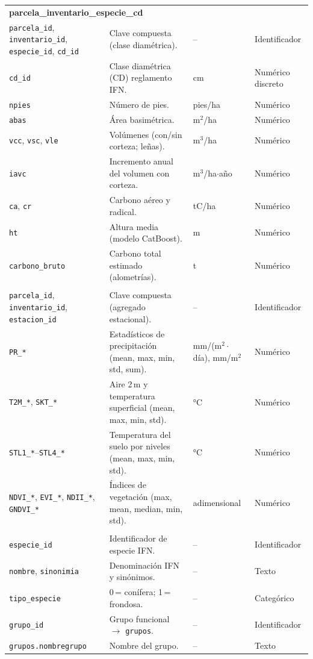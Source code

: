 \begin{longtable}{p{3.2cm} p{7.6cm} p{2.4cm} p{2.4cm}}
\multicolumn{4}{l}{\textbf{parcela\_inventario\_especie\_cd}} \\
\texttt{parcela\_id}, \texttt{inventario\_id}, \texttt{especie\_id}, \texttt{cd\_id} & Clave compuesta (clase diamétrica). & -- & Identificador \\
\texttt{cd\_id} & Clase diamétrica (CD) reglamento IFN. & cm & Numérico discreto \\
\texttt{npies} & Número de pies. & pies/ha & Numérico \\
\texttt{abas} & Área basimétrica. & m$^{2}$/ha & Numérico \\
\texttt{vcc}, \texttt{vsc}, \texttt{vle} & Volúmenes (con/sin corteza; leñas). & m$^{3}$/ha & Numérico \\
\texttt{iavc} & Incremento anual del volumen con corteza. & m$^{3}$/ha$\cdot$año & Numérico \\
\texttt{ca}, \texttt{cr} & Carbono aéreo y radical. & tC/ha & Numérico \\
\texttt{ht} & Altura media (modelo CatBoost). & m & Numérico \\
\texttt{carbono\_bruto} & Carbono total estimado (alometrías). & t & Numérico \\
\addlinespace

\multicolumn{4}{l}{\textbf{parcela\_inventario\_estacion}} \\
\texttt{parcela\_id}, \texttt{inventario\_id}, \texttt{estacion\_id} & Clave compuesta (agregado estacional). & -- & Identificador \\
\texttt{PR\_*} & Estadísticos de precipitación (mean, max, min, std, sum). & mm/(m$^2\cdot$día), mm/m$^2$ & Numérico \\
\texttt{T2M\_*}, \texttt{SKT\_*} & Aire 2\,m y temperatura superficial (mean, max, min, std). & °C & Numérico \\
\texttt{STL1\_*}--\texttt{STL4\_*} & Temperatura del suelo por niveles (mean, max, min, std). & °C & Numérico \\
\texttt{NDVI\_*}, \texttt{EVI\_*}, \texttt{NDII\_*}, \texttt{GNDVI\_*} & Índices de vegetación (max, mean, median, min, std). & adimensional & Numérico \\
\addlinespace

\multicolumn{4}{l}{\textbf{especies} y \textbf{grupos}} \\
\texttt{especie\_id} & Identificador de especie IFN. & -- & Identificador \\
\texttt{nombre}, \texttt{sinonimia} & Denominación IFN y sinónimos. & -- & Texto \\
\texttt{tipo\_especie} & 0\,= conífera; 1\,= frondosa. & -- & Categórico \\
\texttt{grupo\_id} & Grupo funcional $\rightarrow$ \texttt{grupos}. & -- & Identificador \\
\texttt{grupos.nombregrupo} & Nombre del grupo. & -- & Texto \\
\end{longtable}
\normalsize
